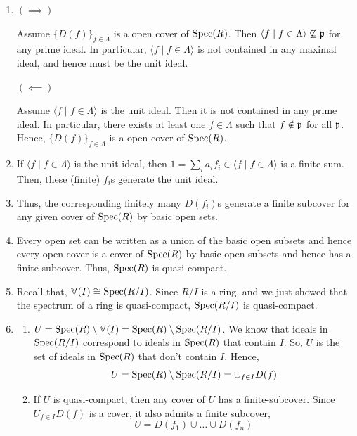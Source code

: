 \documentclass[Notebook.tex]{subfiles}
\begin{document}
\begin{solution}
    \bbni
    \begin{enumerate}
        \item $(\implies)$ 
        
        Assume $\{D(f)\}_{f \in \Lambda}$ is a open cover of $\operatorname{Spec}(R)$. Then $\langle f \mid f \in \Lambda \rangle \not \subseteq \operatorname{\mathfrak{p}}$ for any prime ideal. In particular, $\langle f \mid f \in \Lambda \rangle$ is not contained in any maximal ideal, and hence must be the unit ideal. 

        $(\impliedby)$

        Assume $\langle f \mid f \in \Lambda \rangle$ is the unit ideal. Then it is not contained in any prime ideal. In particular, there exists at least one $f \in \Lambda$ such that $f \notin \operatorname{\mathfrak{p}}$ for all $\operatorname{\mathfrak{p}}$. Hence, $\{D(f)\}_{f \in \Lambda}$ is a open cover of $\operatorname{Spec}(R)$.

        \item If $\langle f \mid f \in \Lambda \rangle$ is the unit ideal, then $1 = \sum_i a_i f_i \in \langle f \mid f \in \Lambda \rangle$ is a finite sum. Then, these (finite) $f_i$s generate the unit ideal. 
        
        \item Thus, the corresponding finitely many $D(f_i)$s generate a finite subcover for any given cover of $\operatorname{Spec}(R)$ by basic open sets. 
        
        \item Every open set can be written as a union of the basic open subsets and hence every open cover is a cover of $\operatorname{Spec}(R)$ by basic open subsets and hence has a finite subcover. Thus, $\operatorname{Spec}(R)$ is quasi-compact. 
        
        \item Recall that, $\mathbb V(I) \cong \operatorname{Spec}(R/I)$. Since $R/I$ is a ring, and we just showed that the spectrum of a ring is quasi-compact, $\operatorname{Spec}(R/I)$ is quasi-compact. 
        
        \item \begin{enumerate}
            \item $U = \operatorname{Spec}(R) \setminus \mathbb V(I) = \operatorname{Spec}(R) \setminus \operatorname{Spec}(R/I)$. We know that ideals in $\operatorname{Spec}(R/I)$ correspond to ideals in $\operatorname{Spec}(R)$ that contain $I$. So, $U$ is the set of ideals in $\operatorname{Spec}(R)$ that don't contain $I$. Hence, 
            \[U = \operatorname{Spec}(R) \setminus \operatorname{Spec}(R/I) = \cup_{f \in I} D(f)\]

            \item If $U$ is quasi-compact, then any cover of $U$ has a finite-subcover. Since $U_{f \in I} D(f)$ is a cover, it also admits a finite subcover, 
            \[U = D(f_1) \cup \ldots \cup D(f_n) \]


\end{enumerate}
\end{enumerate}
\end{solution}
\end{document}
